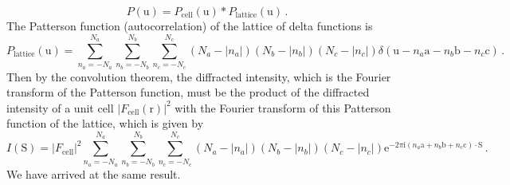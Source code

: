 \documentclass{article}
\theoremstyle{plain}\theoremheaderfont{\normalfont\itshape}\theorembodyfont{\rmfamily}\theoremseparator{.}\newtheorem*{rem}{Remark}\newtheorem*{ex}{Example}\newtheorem*{proof}{Proof}\newtheorem*{altp}{Alternative proof}
\theoremstyle{plain}\theoremheaderfont{\normalfont\bfseries}\theorembodyfont{\rmfamily}\theoremseparator{.}\newtheorem{thm}{Theorem}[section]\newtheorem{lem}[thm]{Lemma}\newtheorem{prop}[thm]{Proposition}\newtheorem*{cor}{Corollary}\newtheorem{defn}[thm]{Definition}\newtheorem{clm}[thm]{Claim}\newtheorem{clminproof}{Claim}\newtheorem*{law}{Law}\newtheorem{pos}[thm]{Postulate}
\theoremstyle{break}\theoremheaderfont{\normalfont\itshape}\theorembodyfont{\rmfamily}\theoremseparator{.\medskip}\newtheorem*{proofskip}{Proof}\newtheorem*{exs}{Examples}\newtheorem*{rems}{Remarks}
\theoremstyle{break}\theoremheaderfont{\normalfont\bfseries}\theorembodyfont{\rmfamily}\theoremseparator{.\medskip}\newtheorem{lemskip}[thm]{Lemma}\newtheorem{defnskip}[thm]{Definition}\newtheorem{propskip}[thm]{Proposition}\newtheorem{thmskip}[thm]{Theorem}
\numberwithin{equation}{section}
\newcommand{\ii}{\mathrm{i}}
\newcommand{\ee}{\mathrm{e}}
\newcommand{\vb}[1]{\bm{\mathrm{#1}}}
\newcommand{\vdot}{\,\bm{\mathrm{\cdot}}\,}
\newcommand{\abs}[1]{\left| #1 \right|}
\begin{document}
    \begin{equation}
        P(\vb{u})=P_{\text{cell}}(\vb{u})*P_{\text{lattice}}(\vb{u})\,.
    \end{equation}
    The Patterson function (autocorrelation) of the lattice of delta functions is
    \begin{equation}
        P_{\text{lattice}}(\vb{u})=\sum_{n_a=-N_a}^{N_a}\sum_{n_b=-N_b}^{N_b}\sum_{n_c=-N_c}^{N_c}(N_a-\abs{n_a})(N_b-\abs{n_b})(N_c-\abs{n_c})\delta(\vb{u}-n_a\vb{a}-n_b\vb{b}-n_c\vb{c})\,.
    \end{equation}
    Then by the convolution theorem, the diffracted intensity, which is the Fourier transform of the Patterson function, must be the product of the diffracted intensity of a unit cell \(\abs{F_{\text{cell}}(\vb{r})}^2\) with the Fourier transform of this Patterson function of the lattice, which is given by
    \begin{equation}
        I(\vb{S})=\abs{F_{\text{cell}}}^2\sum_{n_a=-N_a}^{N_a}\sum_{n_b=-N_b}^{N_b}\sum_{n_c=-N_c}^{N_c}(N_a-\abs{n_a})(N_b-\abs{n_b})(N_c-\abs{n_c})\ee^{-2\pi \ii(n_a\vb{a}+n_b\vb{b}+n_c\vb{c})\vdot\vb{S}}\,.
    \end{equation}
    We have arrived at the same result.
\end{document}
